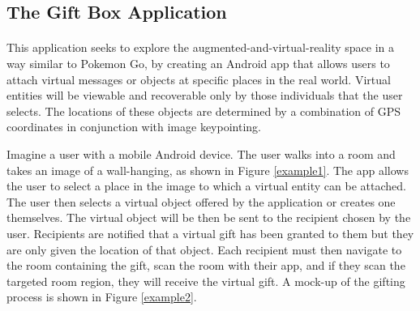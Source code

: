 \subsection{The Gift Box Application}
\paragraph{}
This application seeks to explore the augmented-and-virtual-reality space in a way similar to Pokemon Go, by creating an Android app that allows users to attach virtual messages or objects at specific places in the real world. Virtual entities will be viewable and recoverable only by those individuals that the user selects. The locations of these objects are determined by a combination of GPS coordinates in conjunction with image keypointing.
\par Imagine a user with a mobile Android device. The user walks into a room and takes an image of a wall-hanging, as shown in Figure \ref{example1}. The app allows the user to select a place in the image to which a virtual entity can be attached. The user then selects a virtual object offered by the application or creates one themselves. The virtual object will be then be sent to the recipient chosen by the user. Recipients are notified that a virtual gift has been granted to them but they are only given the location of that object. Each recipient must then navigate to the room containing the gift, scan the room with their app, and if they scan the targeted room region, they will receive the virtual gift. A mock-up of the gifting process is shown in Figure \ref{example2}.

